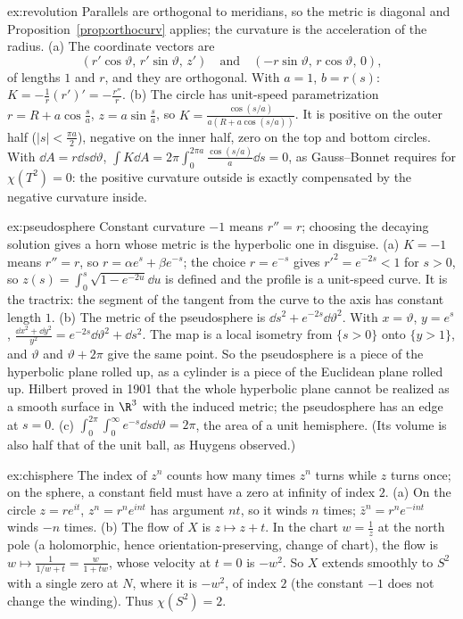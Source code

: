 \begin{solution}{ex:revolution}
\idea Parallels are orthogonal to meridians, so the metric is diagonal and Proposition~\ref{prop:orthocurv} applies; the curvature is the acceleration of the radius.
\writeup (a) The coordinate vectors are
\[(r'\cos\vartheta,\,r'\sin\vartheta,\,z')\quad\text{and}\quad(-r\sin\vartheta,\,r\cos\vartheta,\,0),\]
of lengths $1$ and $r$, and they are orthogonal. With $a=1$, $b=r(s)$:
$K=-\frac1r(r')'=-\frac{r''}r$. (b) The circle has unit-speed parametrization $r=R+a\cos\frac sa$, $z=a\sin\frac sa$, so $K=\frac{\cos(s/a)}{a(R+a\cos(s/a))}$. It is positive on the outer half
($|s|<\frac{\pi a}2$), negative on the inner half, zero on the top and bottom circles. With $\dd A=r\dd s\dd\vartheta$, $\int K\dd A=2\pi\int_0^{2\pi a}\frac{\cos(s/a)}a\dd s=0$, as Gauss--Bonnet requires
for $\chi(T^2)=0$: the positive curvature outside is exactly compensated by the negative curvature inside.
\end{solution}

\begin{solution}{ex:pseudosphere}
\idea Constant curvature $-1$ means $r''=r$; choosing the decaying solution gives a horn whose metric is the hyperbolic one in disguise.
\writeup (a) $K=-1$ means $r''=r$, so $r=\alpha e^s+\beta e^{-s}$; the choice $r=e^{-s}$ gives $r'^2=e^{-2s}<1$ for $s>0$, so $z(s)=\int_0^s\sqrt{1-e^{-2u}}\dd u$ is defined and the
profile is a unit-speed curve. It is the tractrix: the segment of the tangent from the curve to the axis has constant length $1$. (b) The metric of the pseudosphere is
$\dd s^2+e^{-2s}\dd\vartheta^2$. With $x=\vartheta$, $y=e^s$, $\frac{\dd x^2+\dd y^2}{y^2}=e^{-2s}\dd\vartheta^2+\dd s^2$. The map is a local isometry from $\{s>0\}$ onto $\{y>1\}$, and $\vartheta$ and $\vartheta+2\pi$ give the same
point. So the pseudosphere is a piece of the hyperbolic plane rolled up, as a cylinder is a piece of the Euclidean plane rolled up. Hilbert proved in 1901 that the
whole hyperbolic plane cannot be realized as a smooth surface in $\R^3$ with the induced metric; the pseudosphere has an edge at $s=0$. (c)
$\int_0^{2\pi}\int_0^\infty e^{-s}\dd s\dd\vartheta=2\pi$, the area of a unit hemisphere. (Its volume is also half that of the unit ball, as Huygens observed.)
\end{solution}

\begin{solution}{ex:chisphere}
\idea The index of $z^n$ counts how many times $z^n$ turns while $z$ turns once; on the sphere, a constant field must have a zero at infinity of index $2$.
\writeup (a) On the circle $z=re^{it}$, $z^n=r^ne^{int}$ has argument $nt$, so it winds $n$ times; $\bar z^n=r^ne^{-int}$ winds $-n$ times. (b) The flow of $X$ is $z\mapsto z+t$. In the
chart $w=\frac1z$ at the north pole (a holomorphic, hence orientation-preserving, change of chart), the flow is $w\mapsto\frac1{1/w+t}=\frac w{1+tw}$, whose velocity at $t=0$ is $-w^2$. So $X$ extends smoothly to $S^2$ with a single
zero at $N$, where it is $-w^2$, of index $2$ (the constant $-1$ does not change the winding). Thus $\chi(S^2)=2$.
\end{solution}

